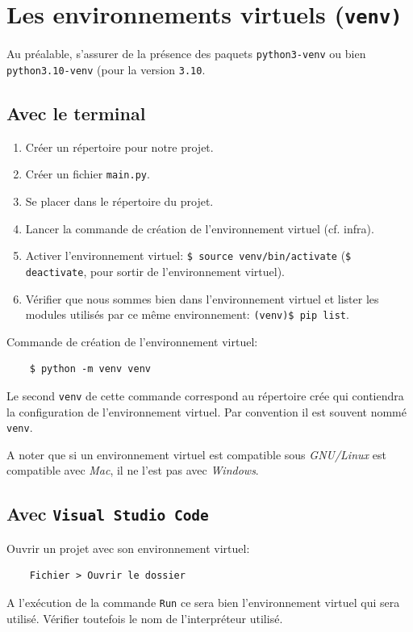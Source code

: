 \documentclass[a4paper,11pt]{book}
\begin{document}
\section{Les environnements virtuels (\texttt{venv)}}
Au préalable, s'assurer de la présence des paquets \texttt{python3-venv} ou bien \texttt{python3.10-venv} (pour la version \texttt{3.10}.
\subsection*{Avec le terminal}
\begin{enumerate}
	\item Créer un répertoire pour notre projet.
	\item Créer un fichier \texttt{main.py}.
	\item Se placer dans le répertoire du projet.
	\item Lancer la commande de création de l'environnement virtuel (cf. infra).
	\item Activer l'environnement virtuel: \verb|$ source venv/bin/activate| (\verb|$ deactivate|, pour sortir de l'environnement virtuel).
	\item Vérifier que nous sommes bien dans l'environnement virtuel et lister les modules utilisés par ce même environnement: \verb|(venv)$ pip list|.
\end{enumerate}
\medskip

Commande de création de l'environnement virtuel:
\begin{verbatim}
    $ python -m venv venv
\end{verbatim}
\medskip

Le second \texttt{venv} de cette commande correspond au répertoire crée qui contiendra la configuration de l'environnement virtuel. Par convention il est souvent nommé \texttt{venv}.
\medskip

A noter que si un environnement virtuel est compatible sous \textit{GNU/Linux} est compatible avec \textit{Mac}, il ne l'est pas avec \textit{Windows}.
\medskip

\subsection*{Avec \texttt{Visual Studio Code}}
Ouvrir un projet avec son environnement virtuel:
\begin{verbatim}
    Fichier > Ouvrir le dossier
\end{verbatim}
\medskip

A l'exécution de la commande \texttt{Run} ce sera bien l'environnement virtuel qui sera utilisé. Vérifier toutefois le nom de l'interpréteur utilisé.
\medskip
\end{document}
